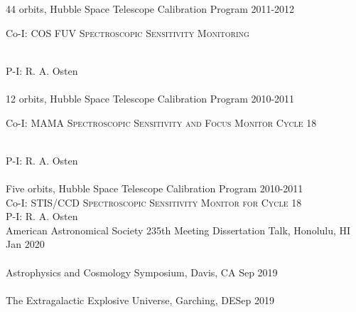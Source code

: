 \documentclass[10pt]{cv}
\begin{document}
\begin{llist}
44 orbits, Hubble Space Telescope Calibration Program \hfill 2011-2012\\ %
\begin{minipage}[l]{0.7\textwidth}\vspace{0.15cm}
Co-I: \textsc{COS FUV Spectroscopic Sensitivity Monitoring} 
\end{minipage}\vspace{0.15cm}\\
P-I: R. A. Osten\\%
\\
12 orbits, Hubble Space Telescope Calibration Program \hfill 2010-2011\\ %
\begin{minipage}[l]{0.7\textwidth}\vspace{0.15cm}
Co-I: \textsc{MAMA Spectroscopic Sensitivity and Focus Monitor Cycle 18} \\
\end{minipage}\vspace{0.15cm}\\
P-I: R. A. Osten \\%
\\
Five orbits, Hubble Space Telescope Calibration Program \hfill 2010-2011\\ %
Co-I: \textsc{STIS/CCD Spectroscopic Sensitivity Monitor for Cycle 18} \\
P-I: R. A. Osten\\%
\vspace{-0.1in}  
American Astronomical Society 235th Meeting Dissertation Talk, Honolulu, HI \hfill Jan 2020\\ \vspace{-0.1in} 
\\
Astrophysics and Cosmology Symposium, Davis, CA \hfill Sep 2019\\\vspace{-0.1in}  
\\
The Extragalactic Explosive Universe, Garching, DE\hfill Sep 2019\\ \vspace{-0.1in}  

\end{llist}
\end{document}
